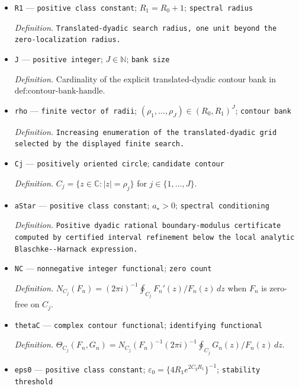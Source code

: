 \documentclass{article}
\begin{document}
\begin{itemize}
  \par\smallskip\noindent\emph{Definition.} \(R_0=(2^{k+4}k!)^{1/(k-2)}(\psi_{\eta}^2/\delta)^{1/(k-2)}\) is the explicit zero-localization radius.
  \item \texttt{R1} --- \texttt{positive class constant}; \(R_1=R_0+1\); \texttt{spectral radius}
  \par\smallskip\noindent\emph{Definition.} \texttt{Translated-\allowbreak{}dyadic search radius,\allowbreak{} one unit beyond the zero-\allowbreak{}localization radius.}
  \item \texttt{J} --- \texttt{positive integer}; \(J\in\mathbb N\); \texttt{bank size}
  \par\smallskip\noindent\emph{Definition.} Cardinality of the explicit translated-dyadic contour bank in \(\text{def:contour-bank-handle}\).
  \item \texttt{rho} --- \texttt{finite vector of radii}; \((\rho_1,\ldots,\rho_J)\in(R_0,R_1)^J\); \texttt{contour bank}
  \par\smallskip\noindent\emph{Definition.} \texttt{Increasing enumeration of the translated-\allowbreak{}dyadic grid selected by the displayed finite search.}
  \item \texttt{Cj} --- \texttt{positively oriented circle}; \texttt{candidate contour}
  \par\smallskip\noindent\emph{Definition.} \(C_j=\{z\in\mathbb C:|z|=\rho_j\}\) for \(j\in\{1,\ldots,J\}\).
  \item \texttt{aStar} --- \texttt{positive class constant}; \(a_{\star}>0\); \texttt{spectral conditioning}
  \par\smallskip\noindent\emph{Definition.} \texttt{Positive dyadic rational boundary-\allowbreak{}modulus certificate computed by certified interval refinement below the local analytic Blaschke-\allowbreak{}-\allowbreak{}Harnack expression.}
  \item \texttt{NC} --- \texttt{nonnegative integer functional}; \texttt{zero count}
  \par\smallskip\noindent\emph{Definition.} \(N_{C_j}(F_n)=(2\pi i)^{-1}\oint_{C_j}F_n'(z)/F_n(z)\,dz\) when \(F_n\) is zero-free on \(C_j\).
  \item \texttt{thetaC} --- \texttt{complex contour functional}; \texttt{identifying functional}
  \par\smallskip\noindent\emph{Definition.} \(\Theta_{C_j}(F_n,G_n)=N_{C_j}(F_n)^{-1}(2\pi i)^{-1}\oint_{C_j}G_n(z)/F_n(z)\,dz\).
  \item \texttt{eps0} --- \texttt{positive class constant}; \(\varepsilon_0=\{4R_1e^{2C_gR_1}\}^{-1}\); \texttt{stability threshold}

\end{itemize}
\end{document}
